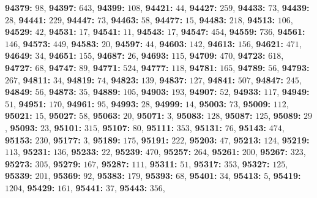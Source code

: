 \textsf{\bfseries 94379:} $98$, \textsf{\bfseries 94397:} $643$, \textsf{\bfseries 94399:} $108$, \textsf{\bfseries 94421:} $44$, \textsf{\bfseries 94427:} $259$, \textsf{\bfseries 94433:} $73$, \textsf{\bfseries 94439:} $28$, \textsf{\bfseries 94441:} $229$, \textsf{\bfseries 94447:} $73$, \textsf{\bfseries 94463:} $58$, \textsf{\bfseries 94477:} $15$, \textsf{\bfseries 94483:} $218$, \textsf{\bfseries 94513:} $106$, \textsf{\bfseries 94529:} $42$, \textsf{\bfseries 94531:} $17$, \textsf{\bfseries 94541:} $11$, \textsf{\bfseries 94543:} $17$, \textsf{\bfseries 94547:} $454$, \textsf{\bfseries 94559:} $736$, \textsf{\bfseries 94561:} $146$, \textsf{\bfseries 94573:} $449$, \textsf{\bfseries 94583:} $20$, \textsf{\bfseries 94597:} $44$, \textsf{\bfseries 94603:} $142$, \textsf{\bfseries 94613:} $156$, \textsf{\bfseries 94621:} $471$, \textsf{\bfseries 94649:} $34$, \textsf{\bfseries 94651:} $155$, \textsf{\bfseries 94687:} $26$, \textsf{\bfseries 94693:} $115$, \textsf{\bfseries 94709:} $470$, \textsf{\bfseries 94723:} $618$, \textsf{\bfseries 94727:} $68$, \textsf{\bfseries 94747:} $89$, \textsf{\bfseries 94771:} $524$, \textsf{\bfseries 94777:} $118$, \textsf{\bfseries 94781:} $165$, \textsf{\bfseries 94789:} $56$, \textsf{\bfseries 94793:} $267$, \textsf{\bfseries 94811:} $34$, \textsf{\bfseries 94819:} $74$, \textsf{\bfseries 94823:} $139$, \textsf{\bfseries 94837:} $127$, \textsf{\bfseries 94841:} $507$, \textsf{\bfseries 94847:} $245$, \textsf{\bfseries 94849:} $56$, \textsf{\bfseries 94873:} $35$, \textsf{\bfseries 94889:} $105$, \textsf{\bfseries 94903:} $193$, \textsf{\bfseries 94907:} $52$, \textsf{\bfseries 94933:} $117$, \textsf{\bfseries 94949:} $51$, \textsf{\bfseries 94951:} $170$, \textsf{\bfseries 94961:} $95$, \textsf{\bfseries 94993:} $28$, \textsf{\bfseries 94999:} $14$, \textsf{\bfseries 95003:} $73$, \textsf{\bfseries 95009:} $112$, \textsf{\bfseries 95021:} $15$, \textsf{\bfseries 95027:} $58$, \textsf{\bfseries 95063:} $20$, \textsf{\bfseries 95071:} $3$, \textsf{\bfseries 95083:} $128$, \textsf{\bfseries 95087:} $125$, \textsf{\bfseries 95089:} $29$, \textsf{\bfseries 95093:} $23$, \textsf{\bfseries 95101:} $315$, \textsf{\bfseries 95107:} $80$, \textsf{\bfseries 95111:} $353$, \textsf{\bfseries 95131:} $76$, \textsf{\bfseries 95143:} $474$, \textsf{\bfseries 95153:} $230$, \textsf{\bfseries 95177:} $3$, \textsf{\bfseries 95189:} $175$, \textsf{\bfseries 95191:} $222$, \textsf{\bfseries 95203:} $47$, \textsf{\bfseries 95213:} $124$, \textsf{\bfseries 95219:} $113$, \textsf{\bfseries 95231:} $136$, \textsf{\bfseries 95233:} $22$, \textsf{\bfseries 95239:} $470$, \textsf{\bfseries 95257:} $264$, \textsf{\bfseries 95261:} $200$, \textsf{\bfseries 95267:} $323$, \textsf{\bfseries 95273:} $305$, \textsf{\bfseries 95279:} $167$, \textsf{\bfseries 95287:} $111$, \textsf{\bfseries 95311:} $51$, \textsf{\bfseries 95317:} $353$, \textsf{\bfseries 95327:} $125$, \textsf{\bfseries 95339:} $201$, \textsf{\bfseries 95369:} $92$, \textsf{\bfseries 95383:} $179$, \textsf{\bfseries 95393:} $68$, \textsf{\bfseries 95401:} $34$, \textsf{\bfseries 95413:} $5$, \textsf{\bfseries 95419:} $1204$, \textsf{\bfseries 95429:} $161$, \textsf{\bfseries 95441:} $37$, \textsf{\bfseries 95443:} $356$, 
